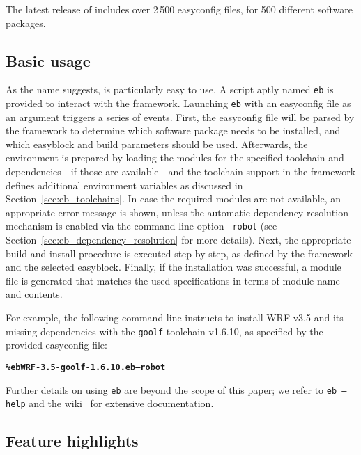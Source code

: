 The latest release of \easybuild{} includes over 2\,500 easyconfig files, for
500 different software packages. 

\subsection{Basic usage}
\label{sec:eb_basic_usage}

As the name suggests, \easybuild{} is  particularly easy to use. A script aptly named
\texttt{\small eb} is provided to interact with the \easybuild{} framework.
Launching \texttt{\small eb} with an easyconfig file as an argument triggers a
series of events. First, the easyconfig file will be parsed by the \easybuild{}
framework to determine which software package needs to be installed, and which
easyblock and build parameters should be used. Afterwards, the environment is
prepared by loading the modules for the specified toolchain and dependencies---if
those are available---and the toolchain support in the framework defines additional
environment variables as discussed in Section~\ref{sec:eb_toolchains}. In case the
required modules are not available, an appropriate error message is shown, unless
the automatic dependency resolution mechanism is enabled via the command line option
\texttt{\small --robot} (see Section~\ref{sec:eb_dependency_resolution} for more
details). Next,
the appropriate build and install procedure is executed step by step, as defined by
the framework and the selected easyblock. Finally, if the installation was successful, a module file is generated that
matches the used specifications in terms of module name and contents.

For example, the following command line instructs \easybuild{} to install WRF v3.5
and its missing dependencies with the \texttt{\small goolf} toolchain v1.6.10, as
specified by the provided easyconfig file:

{\small
\begin{alltt}
    \textbf{\% eb WRF-3.5-goolf-1.6.10.eb --robot}
\end{alltt}
}
\noindent
Further details on using \texttt{\small eb} are beyond the scope of this paper; we
refer to \texttt{\small eb --help} and the \easybuild{} wiki~\cite{ebwiki} for
extensive documentation.

\subsection{Feature highlights}
\label{sec:eb_features}

